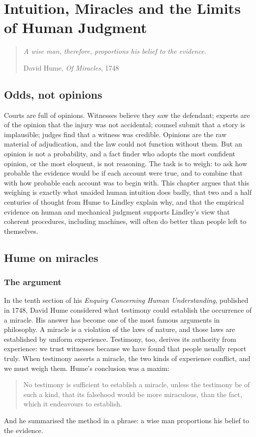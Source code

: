 \chapter{Intuition, Miracles and the Limits of Human Judgment}
\label{ch:hume}

\begin{quote}\itshape
A wise man, therefore, proportions his belief to the evidence.
\par\hfill\normalfont David Hume, \emph{Of Miracles}, 1748
\end{quote}

\section{Odds, not opinions}

Courts are full of opinions. Witnesses believe they saw the defendant; experts are of the opinion that the injury was not accidental; counsel submit that a story is implausible; judges find that a witness was credible. Opinions are the raw material of adjudication, and the law could not function without them. But an opinion is not a probability, and a fact finder who adopts the most confident opinion, or the most eloquent, is not reasoning. The task is to weigh: to ask how probable the evidence would be if each account were true, and to combine that with how probable each account was to begin with. This chapter argues that this weighing is exactly what unaided human intuition does badly, that two and a half centuries of thought from Hume to Lindley explain why, and that the empirical evidence on human and mechanical judgment supports Lindley's view that coherent procedures, including machines, will often do better than people left to themselves.

\section{Hume on miracles}

\subsection{The argument}

In the tenth section of his \emph{Enquiry Concerning Human Understanding}, published in 1748, David Hume considered what testimony could establish the occurrence of a miracle. His answer has become one of the most famous arguments in philosophy. A miracle is a violation of the laws of nature, and those laws are established by uniform experience. Testimony, too, derives its authority from experience: we trust witnesses because we have found that people usually report truly. When testimony asserts a miracle, the two kinds of experience conflict, and we must weigh them. Hume's conclusion was a maxim:
\begin{quote}
No testimony is sufficient to establish a miracle, unless the testimony be of such a kind, that its falsehood would be more miraculous, than the fact, which it endeavours to establish.
\end{quote}
And he summarised the method in a phrase: a wise man proportions his belief to the evidence.

